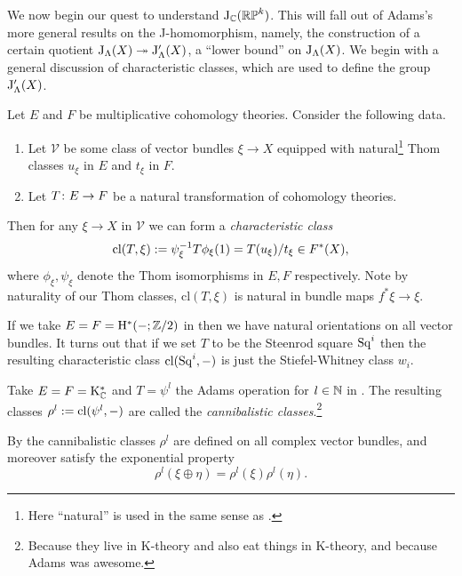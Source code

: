 We now begin our quest to understand $\mathrm{J}_{\mathbb{C}}(\mathbb{RP}^k)$. This will fall
out of Adams's more general results on the J-homomorphism, namely, the
construction of a certain quotient $\mathrm{J}_\Lambda(X) \twoheadrightarrow
\mathrm{J}'_\Lambda(X)$, a ``lower bound'' on $\mathrm{J}_\Lambda(X)$. We begin with a
general discussion of characteristic classes, which are used to define
the group $\mathrm{J}'_\Lambda(X)$.

\renewcommand{\V}{\mathcal{V}}
\newcommand{\cl}{\mathrm{cl}}
\begin{nothing}
  \label{chclass-general}
  Let $E$ and $F$ be multiplicative cohomology theories. Consider the
  following data.
  \begin{enumerate}
  \item Let $\V$ be some class of vector bundles $\xi \to X$ equipped
    with natural\footnote{Here ``natural'' is used in the same sense
      as .} Thom classes $u_\xi$ in $E$ and $t_\xi$ in
    $F$.
  \item Let $T \colon E \to F$ be a natural transformation of cohomology
    theories.
  \end{enumerate}
  Then for any $\xi \to X$ in $\V$ we can form a \emph{characteristic
    class}
  \[
  \cl(T,\xi) \ce \psi_\xi^{-1}T\phi_\xi(1) = T(u_\xi)/t_\xi \in
  F^*(X),
  \]
  where $\phi_\xi,\psi_\xi$ denote the Thom isomorphisms in $E,F$
  respectively. Note by naturality of our Thom classes, $\cl(T,\xi)$
  is natural in bundle maps $f^*\xi \to \xi$.
\end{nothing}

\begin{example}
  \label{stiefel-whitney}
  If we take $E = F = \mathrm{H}^*(-;\mathbb{Z}/2)$ in  then we
  have natural orientations on all vector bundles. It turns out that
  if we set $T$ to be the Steenrod square $\operatorname{Sq}^i$ then the resulting
  characteristic class $\cl(\Sq^i,-)$ is just the Stiefel-Whitney
  class $w_i$.
\end{example}

\begin{definition}
  Take $E = F = \mathrm{K}_{\mathbb{C}}^*$ and $T = \psi^l$ the Adams operation for $l
  \in \mathbb{N}$ in . The resulting classes $\rho^l \ce
  \cl(\psi^l,-)$ are called the \emph{cannibalistic
    classes}.\footnote{Because they live in K-theory and also eat
    things in K-theory, and because Adams was awesome.}
\end{definition}

\begin{remark}
  By  the cannibalistic classes $\rho^l$ are defined on
  all complex vector bundles, and moreover satisfy the exponential
  property
  \begin{equation}
    \label{exponential}
    \rho^l(\xi \oplus \eta) = \rho^l(\xi)\rho^l(\eta).
  \end{equation}
\end{remark}

